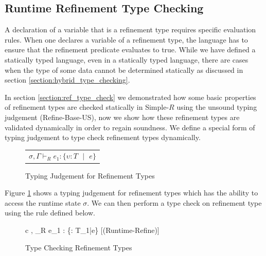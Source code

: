 \documentclass[a4paper,12pt]{report}
\begin{document}
\subsection{Runtime Refinement Type Checking} \label{section:runtime_refine}
A declaration of a variable that is a refinement type requires specific 
evaluation rules. When one declares a variable of a refinement type, the language 
has to ensure that the refinement predicate evaluates to true. While we have 
defined a statically typed language, even in a statically typed language, 
there are cases when the type of some data cannot be determined statically as 
discussed in section \ref{section:hybrid_type_checking}.

\par
In section \ref{section:ref_type_check} we demonstrated how some basic properties 
of refinement types are checked statically in Simple-$R$ using 
the unsound typing judgement (Refine-Base-US), now we show 
how these refinement types are validated dynamically in order to regain soundness. 
We define a special form of typing judgement to type check refinement types 
dynamically.

\begin{figure}[H]
  \begin{center}
    \begin{tabular} {c}
      $\sigma, \Gamma \vdash_{R} e_1 : \{\upsilon : T \text{ }|\text{ }e\}$
    \end{tabular}
  \end{center}
  \caption{Typing Judgement for Refinement Types}
  \label{fig:refine_judgement}
\end{figure}

\par
Figure \ref{fig:refine_judgement} shows a typing judgement for refinement 
types which has the ability to access the runtime state $\sigma$. We can then 
perform a type check on refinement type using the rule defined below. 

\begin{figure}[H]
  \begin{center}
    \begin{tabular} {c}
      {\sigma, \Gamma \vdash_{R} e_1 : \{\upsilon : T_1\text{ }|\text{ }e\}} [(Runtime-Refine)]
    \end{tabular}
  \end{center}
  \caption{Type Checking Refinement Types}
  \label{fig:refine_typecheck}
\end{figure}
\end{document}
